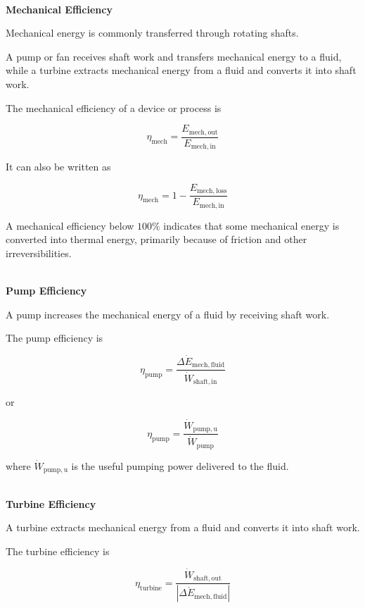 \documentclass[12pt]{article}
\begin{document}
\textbf{\\ Mechanical Efficiency}

Mechanical energy is commonly transferred through rotating shafts.

A pump or fan receives shaft work and transfers mechanical energy to a fluid, while a turbine extracts mechanical energy from a fluid and converts it into shaft work.

The mechanical efficiency of a device or process is

\begin{equation*}
\eta_{\mathrm{mech}}
=
\frac{E_{\mathrm{mech,out}}}
{E_{\mathrm{mech,in}}}
\end{equation*}

It can also be written as

\begin{equation*}
\eta_{\mathrm{mech}}
=
1-
\frac{E_{\mathrm{mech,loss}}}
{E_{\mathrm{mech,in}}}
\end{equation*}

A mechanical efficiency below $100\%$ indicates that some mechanical energy is converted into thermal energy, primarily because of friction and other irreversibilities. 

\textbf{\\ Pump Efficiency}

A pump increases the mechanical energy of a fluid by receiving shaft work.

The pump efficiency is

\begin{equation*}
\eta_{\mathrm{pump}}
=
\frac{\Delta\dot{E}_{\mathrm{mech,fluid}}}
{\dot{W}_{\mathrm{shaft,in}}}
\end{equation*}

or

\begin{equation*}
\eta_{\mathrm{pump}}
=
\frac{\dot{W}_{\mathrm{pump,u}}}
{\dot{W}_{\mathrm{pump}}}
\end{equation*}

where $\dot{W}_{\mathrm{pump,u}}$ is the useful pumping power delivered to the fluid.

\textbf{\\ Turbine Efficiency}

A turbine extracts mechanical energy from a fluid and converts it into shaft work.

The turbine efficiency is

\begin{equation*}
\eta_{\mathrm{turbine}}
=
\frac{\dot{W}_{\mathrm{shaft,out}}}
{\left|\Delta\dot{E}_{\mathrm{mech,fluid}}\right|}
\end{equation*}
\end{document}
